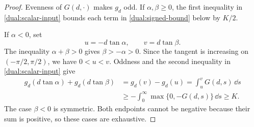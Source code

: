 \begin{proof}
Evenness of \(G(d,\cdot)\) makes \(g_d\) odd. If
\(\alpha,\beta\geq0\), the first inequality in
\eqref{dual:scalar-input} bounds each term in
\eqref{dual:signed-bound} below by \(K/2\).

If \(\alpha<0\), set
\[
 u=-d\tan\alpha,\qquad v=d\tan\beta.
\]
The inequality \(\alpha+\beta>0\) gives \(\beta>-\alpha>0\).
Since the tangent is increasing on \((-\pi/2,\pi/2)\), we have
\(0<u<v\). Oddness and the second inequality in
\eqref{dual:scalar-input} give
\[
 \begin{aligned}
 g_d(d\tan\alpha)+g_d(d\tan\beta)
 &=g_d(v)-g_d(u)=\int_u^vG(d,s)\,\dd s\\
 &\geq-\int_0^\infty\max\{0,-G(d,s)\}\,\dd s\geq K.
 \end{aligned}
\]
The case \(\beta<0\) is symmetric. Both endpoints cannot be negative
because their sum is positive, so these cases are exhaustive.
\end{proof}


